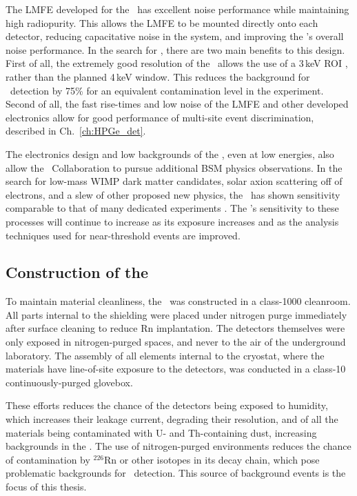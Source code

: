 The LMFE developed for the \DEM\ has excellent noise performance \cite{MJD2014} while maintaining high radiopurity. This allows the LMFE to be mounted directly onto each detector, reducing capacitative noise in the system, and improving the \DEM's overall noise performance. In the search for \nonubb, there are two main benefits to this design. First of all, the extremely good resolution of the \DEM\ allows the use of a 3\,keV ROI \cite{EnergyUnidoc}, rather than the planned 4\,keV window. This reduces the background for \nonubb\ detection by 75\% for an equivalent contamination level in the experiment. Second of all, the fast rise-times and low noise of the LMFE and other developed electronics allow for good performance of multi-site event discrimination, described in Ch.~\ref{ch:HPGe_det}. 

The electronics design and low backgrounds of the \DEM, even at low energies, also allow the \MJ\ Collaboration to pursue additional BSM physics observations. In the search for low-mass WIMP dark matter candidates, solar axion scattering off of electrons, and a slew of other proposed new physics, the \DEM\ has shown sensitivity comparable to that of many dedicated experiments \cite{MJD_WIMP2017}. The \DEM's sensitivity to these processes will continue to increase as its exposure increases and as the analysis techniques used for near-threshold events are improved. 

\subsection{Construction of the \DEM}
To maintain material cleanliness, the \DEM\ was constructed in a class-1000 cleanroom. All parts internal to the shielding were placed under nitrogen purge immediately after surface cleaning to reduce Rn implantation. The detectors themselves were only exposed in nitrogen-purged spaces, and never to the air of the underground laboratory. The assembly of all elements internal to the cryostat, where the materials have line-of-site exposure to the detectors, was conducted in a class-10 continuously-purged glovebox. 

These efforts reduces the chance of the detectors being exposed to humidity, which increases their leakage current, degrading their resolution, and of all the materials being contaminated with U- and Th-containing dust, increasing backgrounds in the \DEM. The use of nitrogen-purged environments reduces the chance of contamination by  $^{226}$Rn or other isotopes in its decay chain, which pose problematic backgrounds for \nonubb\ detection. This source of background events is the focus of this thesis. 


